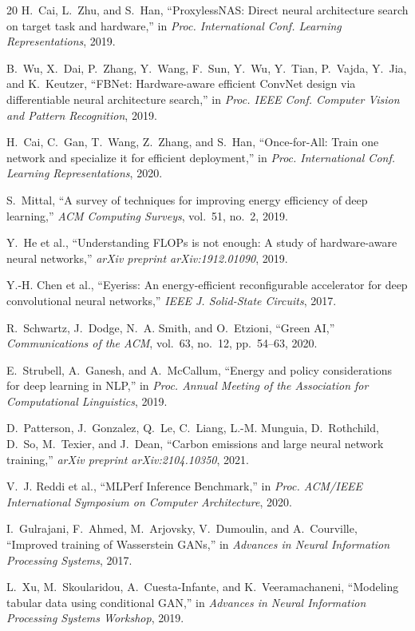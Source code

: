 \documentclass{svproc}
\begin{document}
\begin{thebibliography}{20}
H.~Cai, L.~Zhu, and S.~Han, ``ProxylessNAS: Direct neural architecture search
on target task and hardware,'' in \emph{Proc. International Conf. Learning
Representations}, 2019.

B.~Wu, X.~Dai, P.~Zhang, Y.~Wang, F.~Sun, Y.~Wu, Y.~Tian, P.~Vajda, Y.~Jia,
and K.~Keutzer, ``FBNet: Hardware-aware efficient ConvNet design via
differentiable neural architecture search,'' in \emph{Proc. IEEE Conf.
Computer Vision and Pattern Recognition}, 2019.

H.~Cai, C.~Gan, T.~Wang, Z.~Zhang, and S.~Han, ``Once-for-All: Train one
network and specialize it for efficient deployment,'' in \emph{Proc.
International Conf. Learning Representations}, 2020.

S.~Mittal, ``A survey of techniques for improving energy efficiency of deep
learning,'' \emph{ACM Computing Surveys}, vol.~51, no.~2, 2019.

Y.~He et al., ``Understanding FLOPs is not enough: A study of hardware-aware
neural networks,'' \emph{arXiv preprint arXiv:1912.01090}, 2019.

Y.-H. Chen et al., ``Eyeriss: An energy-efficient reconfigurable accelerator
for deep convolutional neural networks,'' \emph{IEEE J. Solid-State Circuits},
2017.

R.~Schwartz, J.~Dodge, N.~A. Smith, and O.~Etzioni, ``Green AI,''
\emph{Communications of the ACM}, vol.~63, no.~12, pp.~54--63, 2020.

E.~Strubell, A.~Ganesh, and A.~McCallum, ``Energy and policy considerations
for deep learning in NLP,'' in \emph{Proc. Annual Meeting of the Association
for Computational Linguistics}, 2019.

D.~Patterson, J.~Gonzalez, Q.~Le, C.~Liang, L.-M. Munguia, D.~Rothchild,
D.~So, M.~Texier, and J.~Dean, ``Carbon emissions and large neural network
training,'' \emph{arXiv preprint arXiv:2104.10350}, 2021.

V.~J. Reddi et al., ``MLPerf Inference Benchmark,'' in \emph{Proc. ACM/IEEE
International Symposium on Computer Architecture}, 2020.

I.~Gulrajani, F.~Ahmed, M.~Arjovsky, V.~Dumoulin, and A.~Courville,
``Improved training of Wasserstein GANs,'' in \emph{Advances in Neural
Information Processing Systems}, 2017.

L.~Xu, M.~Skoularidou, A.~Cuesta-Infante, and K.~Veeramachaneni, ``Modeling
tabular data using conditional GAN,'' in \emph{Advances in Neural Information
Processing Systems Workshop}, 2019.

\end{thebibliography}
\end{document}
